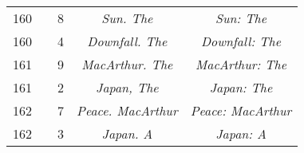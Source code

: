 \documentclass[a4paper,11pt]{article}
\numberwithin{equation}{section}
\begin{document}
\begin{center}
\begin{tabular}{|c|c|c|c|c|}
    160 & &  8 & \textit{Sun. The} & \textit{Sun: The} \\
    160 & &  4 & \textit{Downfall. The} & \textit{Downfall: The} \\
    161 & &  9 & \textit{MacArthur. The} & \textit{MacArthur: The} \\
    161 & &  2 & \textit{Japan, The} & \textit{Japan: The} \\
    162 & &  7 & \textit{Peace. MacArthur} & \textit{Peace: MacArthur} \\
    162 & &  3 & \textit{Japan. A} & \textit{Japan: A} \\
    \hline
  \end{tabular}





  \newpage


\end{center}
\end{document}
